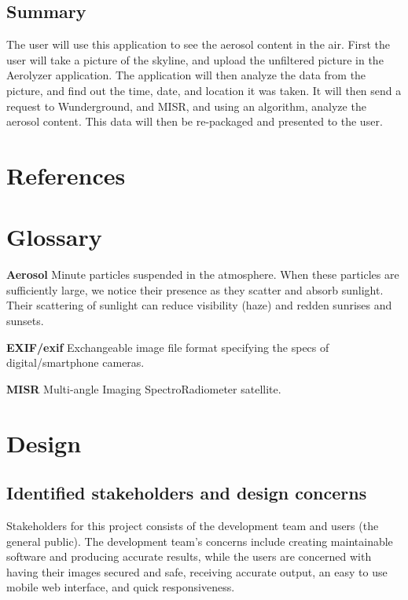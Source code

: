 \documentclass[onecolumn, draftclsnofoot,10pt, compsoc]{IEEEtran}
\begin{document}
\begin{flushleft}
\subsection{Summary}
The user will use this application to see the aerosol content in the air. First the user will take a picture of the skyline, and upload the unfiltered picture in the Aerolyzer application. The application will then analyze the data from the picture, and find out the time, date, and location it was taken. It will then send a request to Wunderground, and MISR, and using an algorithm, analyze the aerosol content. This data will then be re-packaged and presented to the user. 

\clearpage

\section{References}



\section{Glossary}
\textbf{Aerosol} Minute particles suspended in the atmosphere. When these particles are sufficiently large, we notice their presence as they scatter and absorb sunlight. Their scattering of sunlight can reduce visibility (haze) and redden sunrises and sunsets. \cite{1}

\medskip

\textbf{EXIF/exif} Exchangeable image file format specifying the specs of digital/smartphone cameras.

\medskip

\textbf{MISR} Multi-angle Imaging SpectroRadiometer satellite. \cite{2}

\clearpage

\section{Design}

\subsection{Identified stakeholders and design concerns}
Stakeholders for this project consists of the development team and users (the general public). The development team's concerns include creating maintainable software and producing accurate results, while the users are concerned with having their images secured and safe, receiving accurate output, an easy to use mobile web interface, and quick responsiveness. 


\end{flushleft}
\end{document}
